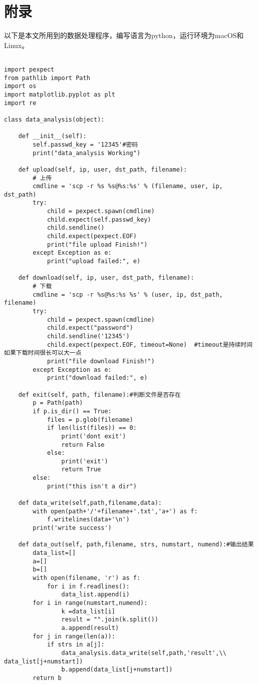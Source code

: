 \section*{附录}

\begin{description}
    \item 
    以下是本文所用到的数据处理程序，编写语言为python，运行环境为macOS和Linux。
	\begin{lstlisting}
		
import pexpect
from pathlib import Path
import os
import matplotlib.pyplot as plt
import re

class data_analysis(object):

    def __init__(self):
        self.passwd_key = '12345'#密码
        print("data_analysis Working")

    def upload(self, ip, user, dst_path, filename):
        # 上传
        cmdline = 'scp -r %s %s@%s:%s' % (filename, user, ip, dst_path)
        try:
            child = pexpect.spawn(cmdline)
            child.expect(self.passwd_key)
            child.sendline()
            child.expect(pexpect.EOF)
            print("file upload Finish!")
        except Exception as e:
            print("upload failed:", e)

    def download(self, ip, user, dst_path, filename):
        # 下载
        cmdline = 'scp -r %s@%s:%s %s' % (user, ip, dst_path, filename)
        try:
            child = pexpect.spawn(cmdline)
            child.expect("password")
            child.sendline('12345')
            child.expect(pexpect.EOF, timeout=None)  #timeout是持续时间如果下载时间很长可以大一点
            print("file download Finish!")
        except Exception as e:
            print("download failed:", e)

    def exit(self, path, filename):#判断文件是否存在
        p = Path(path)
        if p.is_dir() == True:
            files = p.glob(filename)
            if len(list(files)) == 0:
                print('dont exit')
                return False
            else:
                print('exit')
                return True
        else:
            print("this isn't a dir")

    def data_write(self,path,filename,data):
        with open(path+'/'+filename+'.txt','a+') as f:
            f.writelines(data+'\n')
        print('write success')

    def data_out(self, path,filename, strs, numstart, numend):#输出结果
        data_list=[]
        a=[]
        b=[]
        with open(filename, 'r') as f:
            for i in f.readlines():
                data_list.append(i)
        for i in range(numstart,numend):
                k =data_list[i]
                result = "".join(k.split())
                a.append(result)
        for j in range(len(a)):
            if strs in a[j]:
                data_analysis.data_write(self,path,'result',\\ data_list[j+numstart])
                b.append(data_list[j+numstart])
        return b


\end{lstlisting}
\end{description}
